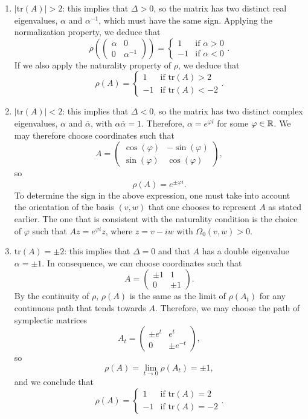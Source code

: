 \begin{enumerate}
	\item $|\text{tr}(A)| > 2$: this implies that $\Delta > 0$, so the matrix has two distinct real eigenvalues, $\alpha$ and $\alpha^{-1}$, which must have the same sign. Applying the normalization property, we deduce that
	\[\rho\left(\begin{pmatrix}\alpha & 0 \\ 0 & \alpha^{-1}\end{pmatrix}\right) = \left\{ \begin{array}{lc} 1 & \text{if } \alpha > 0 \\ -1 & \text{if } \alpha < 0 \end{array} \right. .\]
	If we also apply the naturality property of $\rho$, we deduce that
	\[\rho(A) = \left\{ \begin{array}{lc} 1 & \text{if tr}(A) > 2 \\ -1 & \text{if tr}(A) < -2 \end{array} \right. .\]
	\item $|\text{tr}(A)| < 2$: this implies that $\Delta < 0$, so the matrix has two distinct complex eigenvalues, $\alpha$ and $\overline{\alpha}$, with $\alpha\overline{\alpha} = 1$. Therefore, $\alpha = e^{\varphi i}$ for some $\varphi \in \mathbb{R}$. We may therefore choose coordinates such that
	\[A = \begin{pmatrix} \cos(\varphi) & -\sin(\varphi) \\ \sin(\varphi) & \cos(\varphi) \end{pmatrix} ,\]
	so
	\[\rho(A) = e^{\pm \varphi i} .\]
	To determine the sign in the above expression, one must take into account the orientation of the basis $(v,w)$ that one chooses to represent $A$ as stated earlier. The one that is consistent with the naturality condition is the choice of $\varphi$ such that $Az = e^{\varphi i} z$, where $z = v - iw$ with $\Omega_0(v,w) > 0$.
	\item $\text{tr}(A) = \pm 2$: this implies that $\Delta = 0$ and that $A$ has a double eigenvalue $\alpha = \pm 1$. In consequence, we can choose coordinates such that
	\[A = \begin{pmatrix} \pm 1 & 1 \\ 0 & \pm 1 \end{pmatrix} .\]
	By the continuity of $\rho$, $\rho(A)$ is the same as the limit of $\rho(A_t)$ for any continuous path that tends towards $A$. Therefore, we may choose the path of symplectic matrices
	\[A_t = \begin{pmatrix} \pm e^t & e^t \\ 0 & \pm e^{-t} \end{pmatrix} ,\]
	so
	\[\rho(A) = \lim_{t \rightarrow 0} \rho(A_t) = \pm 1 ,\]
	and we conclude that
	\[\rho(A) = \left\{ \begin{array}{lc} 1 & \text{if tr}(A) = 2 \\ -1 & \text{if tr}(A) = -2 \end{array} \right. .\]
\end{enumerate}


